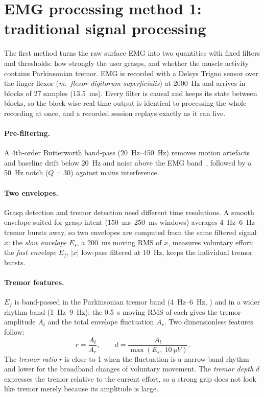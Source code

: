 \section{EMG processing method 1: traditional signal processing}
\label{sec:dsp}

The first method turns the raw surface EMG into two quantities with fixed filters and
thresholds: how strongly the user grasps, and whether the muscle activity contains
Parkinsonian tremor. EMG is recorded with a Delsys Trigno sensor over the finger flexor
(\textit{m.\ flexor digitorum superficialis}) at \SI{2000}{Hz} and arrives in blocks of
27 samples (\SI{13.5}{ms}). Every filter is causal and keeps its state between blocks, so
the block-wise real-time output is identical to processing the whole recording at once,
and a recorded session replays exactly as it ran live.

\paragraph{Pre-filtering.}
A 4th-order Butterworth band-pass (\SIrange{20}{450}{Hz}) removes motion artefacts and
baseline drift below \SI{20}{Hz} and noise above the EMG band~\cite{deluca2010filtering},
followed by a \SI{50}{Hz} notch ($Q=30$) against mains interference.

\paragraph{Two envelopes.}
Grasp detection and tremor detection need different time resolutions. A smooth
envelope suited for grasp intent (\SIrange{150}{250}{ms} windows) averages
\SIrange{4}{6}{Hz} tremor bursts away, so two envelopes are computed from the same
filtered signal $x$:
the \emph{slow envelope} $E_s$, a \SI{200}{ms} moving RMS of $x$, measures voluntary
effort; the \emph{fast envelope} $E_f$, $|x|$ low-pass filtered at \SI{10}{Hz}, keeps the
individual tremor bursts.

\paragraph{Tremor features.}
$E_f$ is band-passed in the Parkinsonian tremor band (\SIrange{4}{6}{Hz},
\cite{deuschl1998consensus}) and in a wider rhythm band (\SIrange{1}{9}{Hz}); the
\SI{0.5}{s} moving RMS of each gives the tremor amplitude $A_t$ and the total envelope
fluctuation $A_r$. Two dimensionless features follow:
\begin{equation}
  r = \frac{A_t}{A_r}, \qquad d = \frac{A_t}{\max(E_s,\ \SI{10}{\micro V})}.
\end{equation}
The \emph{tremor ratio} $r$ is close to 1 when the fluctuation is a narrow-band rhythm
and lower for the broadband changes of voluntary movement. The \emph{tremor depth} $d$
expresses the tremor relative to the current effort, so a strong grip does not look like
tremor merely because its amplitude is large.

